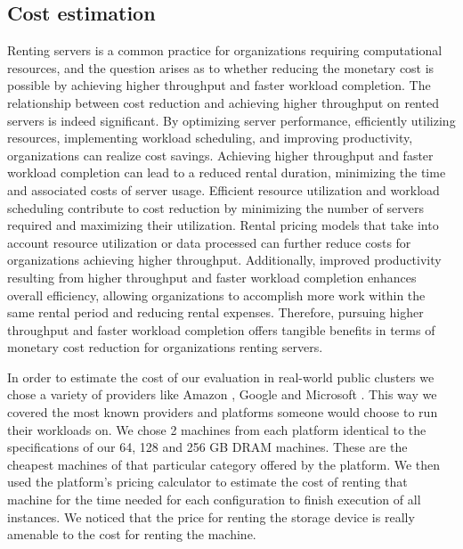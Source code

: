 \subsection{Cost estimation}
Renting servers is a common practice for organizations requiring
computational resources, and the question arises as to whether
reducing the monetary cost is possible by achieving higher throughput
and faster workload completion. The relationship between cost
reduction and achieving higher throughput on rented servers is indeed
significant. By optimizing server performance, efficiently utilizing
resources, implementing workload scheduling, and improving
productivity, organizations can realize cost savings. Achieving higher
throughput and faster workload completion can lead to a reduced rental
duration, minimizing the time and associated costs of server usage.
Efficient resource utilization and workload scheduling contribute to
cost reduction by minimizing the number of servers required and
maximizing their utilization. Rental pricing models that take into
account resource utilization or data processed can further reduce
costs for organizations achieving higher throughput. Additionally,
improved productivity resulting from higher throughput and faster
workload completion enhances overall efficiency, allowing
organizations to accomplish more work within the same rental period
and reducing rental expenses. Therefore, pursuing higher throughput
and faster workload completion offers tangible benefits in terms of
monetary cost reduction for organizations renting servers. 

In order to estimate the cost of our evaluation in real-world public clusters we
chose a variety of providers like Amazon \cite{EC2}, Google \cite{GCP} and Microsoft \cite{Azure}. This
way we covered the most known providers and platforms someone would
choose to run their workloads on. We chose 2 machines from each
platform identical to the specifications of our 64, 128 and 256 GB DRAM
machines. These are the cheapest machines of that particular category
offered by the platform. We then used the platform's pricing
calculator to estimate the cost of renting that machine for the time
needed for each configuration to finish execution of all instances. We noticed that the price for
renting the storage device is really amenable to the cost for renting the machine.
